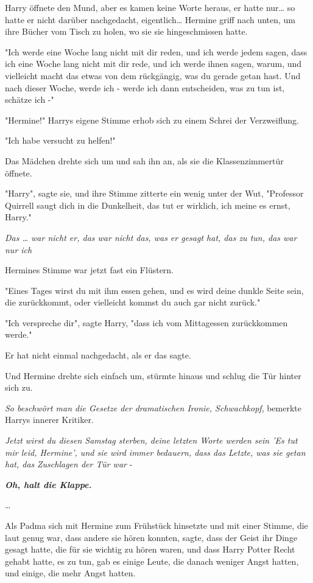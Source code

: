 {Harry öffnete den Mund, aber es kamen keine Worte heraus, er hatte nur… so hatte er nicht darüber nachgedacht, eigentlich… Hermine griff nach unten, um ihre Bücher vom Tisch zu holen, wo sie sie hingeschmissen hatte.

"Ich werde eine Woche lang nicht mit dir reden, und ich werde jedem sagen, dass ich eine Woche lang nicht mit dir rede, und ich werde ihnen sagen, warum, und vielleicht macht das etwas von dem rückgängig, was du gerade getan hast. Und nach dieser Woche, werde ich - werde ich dann entscheiden, was zu tun ist, schätze ich -"

"Hermine!" Harrys eigene Stimme erhob sich zu einem Schrei der Verzweiflung.

"Ich habe versucht zu helfen!"

Das Mädchen drehte sich um und sah ihn an, als sie die Klassenzimmertür öffnete.

"Harry", sagte sie, und ihre Stimme zitterte ein wenig unter der Wut, "Professor Quirrell saugt dich in die Dunkelheit, das tut er wirklich, ich meine es ernst, Harry."

\emph{Das … war nicht er, das war nicht das, was er gesagt hat, das zu tun, das war nur ich}

Hermines Stimme war jetzt fast ein Flüstern.

"Eines Tages wirst du mit ihm essen gehen, und es wird deine dunkle Seite sein, die zurückkommt, oder vielleicht kommst du auch gar nicht zurück."

"Ich verspreche dir", sagte Harry, "dass ich vom Mittagessen zurückkommen werde."

Er hat nicht einmal nachgedacht, als er das sagte.

Und Hermine drehte sich einfach um, stürmte hinaus und schlug die Tür hinter sich zu.

\emph{So beschwört man die Gesetze der dramatischen Ironie, Schwachkopf}, bemerkte Harrys innerer Kritiker.

\emph{Jetzt wirst du diesen Samstag sterben, deine letzten Worte werden sein 'Es tut mir leid, Hermine', und sie wird immer bedauern, dass das Letzte, was sie getan hat, das} \emph{Zuschlagen der Tür war} -

\textbf{\emph{Oh, halt die Klappe.}}

…

Als Padma sich mit Hermine zum Frühstück hinsetzte und mit einer Stimme, die laut genug war, dass andere sie hören konnten, sagte, dass der Geist ihr Dinge gesagt hatte, die für sie wichtig zu hören waren, und dass Harry Potter Recht gehabt hatte, es zu tun, gab es einige Leute, die danach weniger Angst hatten, und einige, die mehr Angst hatten.

}

